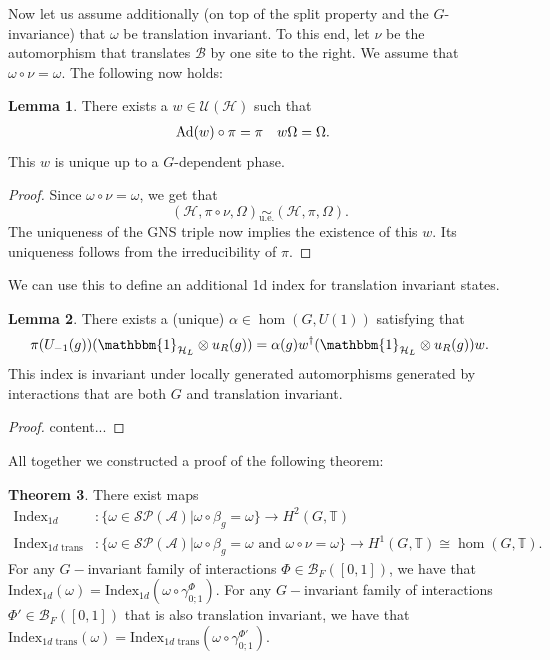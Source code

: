 \documentclass[12pt,a4paper,twoside]{article}
\let\originalleft\left
\let\originalright\right
\renewcommand{\left}{\mathopen{}\mathclose\bgroup\originalleft}
\renewcommand{\right}{\aftergroup\egroup\originalright}
\newcommand{\UU}{\mathcal U}
\newcommand{\BB}{\mathcal B}
\newcommand{\PP}{\mathcal P}
\newcommand{\HH}{\mathcal H}
\newcommand{\TT}{\mathbb T}
\renewcommand{\AA}{\mathcal A}
\newcommand{\id}{\mathbbm{1}}
\newcommand{\Ad}[1]{\textrm{Ad}\left(#1\right)}
\newcommand{\ue}{\underset{\text{u.e.}}{\sim}}
\theoremstyle{definition}
\newtheorem{theorem}{Theorem}[section]
\newtheorem{lemma}[theorem]{Lemma}
\numberwithin{equation}{section}
\begin{document}
Now let us assume additionally (on top of the split property and the $G$-invariance) that $\omega$ be translation invariant. To this end, let $\nu$ be the automorphism that translates $\BB$ by one site to the right. We assume that $\omega\circ\nu=\omega$. The following now holds:
\begin{lemma}
	There exists a $w\in\UU(\HH)$ such that
	\begin{align}
		\Ad{w}\circ\pi&=\pi&w\Omega&=\Omega.
	\end{align}
	This $w$ is unique up to a $G$-dependent phase.
\end{lemma}
\begin{proof}
	Since $\omega\circ\nu=\omega$, we get that
	\begin{equation}
		(\HH,\pi\circ\nu,\Omega)\ue (\HH,\pi,\Omega).
	\end{equation}
	The uniqueness of the GNS triple now implies the existence of this $w$. Its uniqueness follows from the irreducibility of $\pi$.
\end{proof}
We can use this to define an additional 1d index for translation invariant states.
\begin{lemma}
	There exists a (unique) $\alpha\in\hom(G,U(1))$ satisfying that
	\begin{equation}
		\pi(U_{-1}(g)) (\id_{\HH_L}\otimes u_R(g))=\alpha(g)w^\dagger(\id_{\HH_L}\otimes u_R(g)) w.
	\end{equation}
	This index is invariant under locally generated automorphisms generated by interactions that are both $G$ and translation invariant.
\end{lemma}
\begin{proof}
	content...
\end{proof}
All together we constructed a proof of the following theorem:
\begin{theorem}
	There exist maps
	\begin{align}
		\textrm{Index}_{1d}&:\{\omega\in\mathcal{S}\PP(\AA)|\omega\circ\beta_g=\omega\}\rightarrow H^2(G,\TT)\\
		\textrm{Index}_{1d\text{ trans}}&:\{\omega\in\mathcal{S}\PP(\AA)|\omega\circ\beta_g=\omega\text{ and }\omega\circ\nu=\omega\}\rightarrow H^1(G,\TT)\cong \hom(G,\TT).
	\end{align}
	For any $G-$invariant family of interactions $\Phi\in\BB_{F}([0,1])$, we have that $\textrm{Index}_{1d}(\omega)=\textrm{Index}_{1d}(\omega\circ\gamma^\Phi_{0;1})$. For any $G-$invariant family of interactions $\Phi'\in\BB_{F}([0,1])$ that is also translation invariant, we have that $\textrm{Index}_{1d\text{ trans}}(\omega)=\textrm{Index}_{1d\text{ trans}}(\omega\circ\gamma^{\Phi'}_{0;1})$.
\end{theorem}
\end{document}
